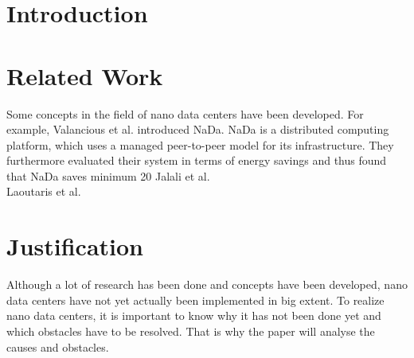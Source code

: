 \documentclass[sigchi-a, authorversion]{acmart}
\begin{document}

\maketitle

%  
%  
%  
%



\section{Introduction} %

\section{Related Work} %
Some concepts in the field of nano data centers have been developed. For example, Valancious et al. \cite{DBLP:conf/conext/ValanciusLMDR09} introduced NaDa. NaDa is a distributed computing platform, which uses a managed peer-to-peer model for its infrastructure. They furthermore evaluated their system in terms of energy savings and thus found that NaDa saves minimum 20%
Jalali et al. \cite{DBLP:journals/sigmetrics/JalaliAVHAT14}\\
Laoutaris et al. \cite{Laoutaris:2008:EEC:1341431.1341442}\\

\section{Justification} %
Although a lot of research has been done and concepts have been developed, nano data centers have not yet actually been implemented in big extent. To realize nano data centers, it is important to know why it has not been done yet and which obstacles have to be resolved. That is why the paper will analyse the causes and obstacles.
\end{document}
